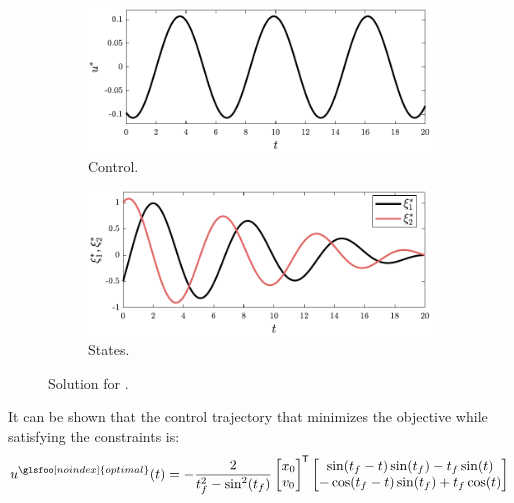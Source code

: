 \begin{figure}
\centering

\begin{subfigure}{0.5\textwidth}
\centering
\includegraphics[width=\textwidth]{../ch5/figures/ex1sol-controls}%
\caption{Control.}
\label{fig:ch5:ex1sol:controls}
\end{subfigure}%
\begin{subfigure}{0.5\textwidth}
\centering
\includegraphics[width=\textwidth]{../ch5/figures/ex1sol-states}%
\caption{States.}
\label{fig:ch5:ex1sol:states}
\end{subfigure}%

\caption{Solution for .}
\label{fig:ch5:ex1sol}
\end{figure}

It can be shown that the control trajectory that minimizes the objective while satisfying the constraints is:
\begin{align}
u^{\glsfoo[noindex]{optimal}}(t) = -\frac{2}{t_f^2 - \sin^2(t_f)}
\begin{bmatrix}
x_0 \\ v_0 
\end{bmatrix}\tran
\begin{bmatrix}
\sin(t_f -t) \sin(t_f) - t_f \sin(t) \\
-\cos(t_f -t) \sin(t_f) + t_f \cos(t)
\end{bmatrix}
\end{align}


